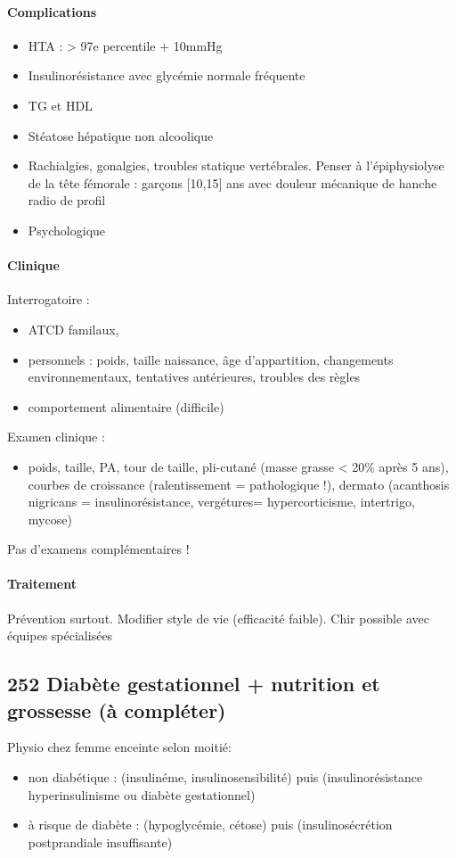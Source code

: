 \documentclass[11pt]{article}
\begin{document}
\paragraph{Complications}
\label{sec:orge2e438f}
\begin{itemize}
\item HTA : > 97e percentile + 10mmHg
\item Insulinorésistance avec glycémie normale fréquente
\item \inc TG et \dec HDL
\item Stéatose hépatique non alcoolique
\item Rachialgies, gonalgies, troubles statique vertébrales. Penser à l'épiphysiolyse
de la tête fémorale : garçons [10,15] ans avec douleur mécanique de hanche
\thus radio de profil
\item Psychologique
\end{itemize}

\paragraph{Clinique}
\label{sec:orgfd113a4}
Interrogatoire : 
\begin{itemize}
\item ATCD familaux,
\item personnels : poids, taille naissance, âge d'appartition, changements environnementaux, tentatives antérieures, troubles des règles
\item comportement alimentaire (difficile)
\end{itemize}
Examen clinique :
\begin{itemize}
\item poids, taille, PA, tour de taille, pli-cutané (masse grasse < 20\% après 5 ans), courbes de
croissance (ralentissement = pathologique !), dermato (acanthosis nigricans =
insulinorésistance, vergétures= hypercorticisme, intertrigo, mycose)
\end{itemize}
Pas d'examens complémentaires !

\paragraph{Traitement}
\label{sec:org5b99529}
Prévention surtout. Modifier style de vie (efficacité faible). Chir possible
avec équipes spécialisées
\subsection{252 \textdagger{} Diabète gestationnel + nutrition et grossesse (à compléter)}
\label{sec:org51275ba}
\label{orgb7dc997}
 Physio chez femme enceinte selon moitié:
\begin{itemize}
\item non diabétique : (\inc insulinéme, insulinosensibilité) puis (insulinorésistance
\thus hyperinsulinisme ou diabète gestationnel)
\item à risque de diabète : (hypoglycémie, cétose) puis (insulinosécrétion
postprandiale insuffisante)
\end{itemize}
\end{document}
